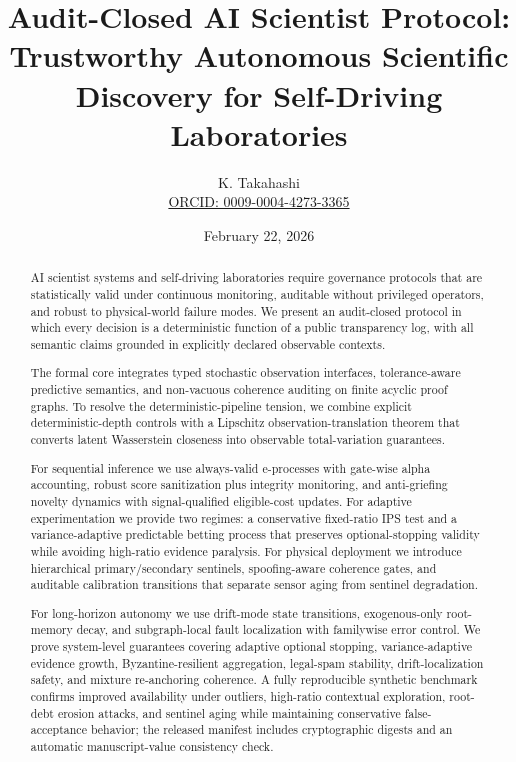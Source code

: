 \documentclass[11pt,a4paper]{article}
\title{\textbf{Audit-Closed AI Scientist Protocol:}\\
\Large{Trustworthy Autonomous Scientific Discovery for Self-Driving Laboratories}}
\author{K. Takahashi\\
\footnotesize \href{https://orcid.org/0009-0004-4273-3365}{ORCID: 0009-0004-4273-3365}}
\date{February 22, 2026}
\begin{document}
\maketitle

\begin{abstract}
AI scientist systems and self-driving laboratories require governance protocols that are statistically valid under continuous monitoring, auditable without privileged operators, and robust to physical-world failure modes.
We present an audit-closed protocol in which every decision is a deterministic function of a public transparency log, with all semantic claims grounded in explicitly declared observable contexts.

The formal core integrates typed stochastic observation interfaces, tolerance-aware predictive semantics, and non-vacuous coherence auditing on finite acyclic proof graphs.
To resolve the deterministic-pipeline tension, we combine explicit deterministic-depth controls with a Lipschitz observation-translation theorem that converts latent Wasserstein closeness into observable total-variation guarantees.

For sequential inference we use always-valid e-processes with gate-wise alpha accounting, robust score sanitization plus integrity monitoring, and anti-griefing novelty dynamics with signal-qualified eligible-cost updates.
For adaptive experimentation we provide two regimes: a conservative fixed-ratio IPS test and a variance-adaptive predictable betting process that preserves optional-stopping validity while avoiding high-ratio evidence paralysis.
For physical deployment we introduce hierarchical primary/secondary sentinels, spoofing-aware coherence gates, and auditable calibration transitions that separate sensor aging from sentinel degradation.

For long-horizon autonomy we use drift-mode state transitions, exogenous-only root-memory decay, and subgraph-local fault localization with familywise error control.
We prove system-level guarantees covering adaptive optional stopping, variance-adaptive evidence growth, Byzantine-resilient aggregation, legal-spam stability, drift-localization safety, and mixture re-anchoring coherence.
A fully reproducible synthetic benchmark confirms improved availability under outliers, high-ratio contextual exploration, root-debt erosion attacks, and sentinel aging while maintaining conservative false-acceptance behavior; the released manifest includes cryptographic digests and an automatic manuscript-value consistency check.
\end{abstract}
\end{document}
